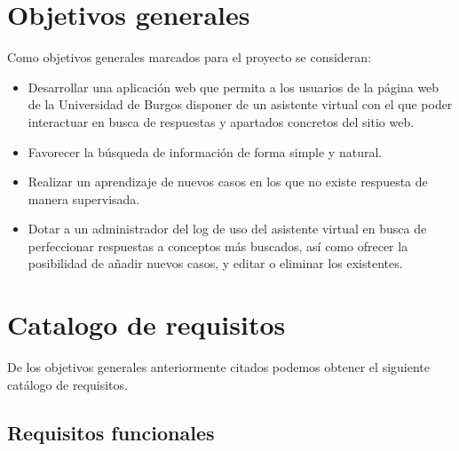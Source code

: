 \section{Objetivos generales}

Como objetivos generales marcados para el proyecto se consideran:

\begin{itemize}
\tightlist
\item
  Desarrollar una aplicación web que permita a los usuarios de la página web de la Universidad de Burgos disponer de un asistente virtual con el que poder interactuar en busca de respuestas y apartados concretos del sitio web.
\item
  Favorecer la búsqueda de información de forma simple y natural.
\item
  Realizar un aprendizaje de nuevos casos en los que no existe respuesta de manera supervisada.
\item
  Dotar a un administrador del log de uso del asistente virtual en busca de perfeccionar respuestas a conceptos más buscados, así como ofrecer la posibilidad de añadir nuevos casos, y editar o eliminar los existentes.
\end{itemize}

\section{Catalogo de requisitos}

De los objetivos generales anteriormente citados podemos obtener el siguiente catálogo de requisitos.

\subsection{Requisitos funcionales}

